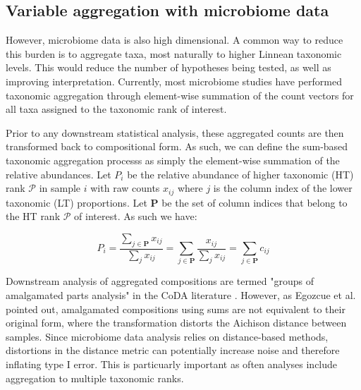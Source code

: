 \documentclass{article}
\begin{document}
\subsection*{Variable aggregation with microbiome data} 
However, microbiome data is also high dimensional. A common way to reduce this burden is to aggregate taxa, most naturally to higher Linnean taxonomic levels. This would reduce the number of hypotheses being tested, as well as improving interpretation. Currently, most microbiome studies have performed taxonomic aggregation through element-wise summation of the count vectors for all taxa assigned to the taxonomic rank of interest. 

Prior to any downstream statistical analysis, these aggregated counts are then transformed back to compositional form. As such, we can define the sum-based taxonomic aggregation processs as simply the element-wise summation of the relative abundances. Let $P_{i}$ be the relative abundance of higher taxonomic (HT) rank $\mathcal{P}$ in sample $i$ with raw counts $x_{ij}$ where $j$ is the column index of the lower taxonomic (LT) proportions. Let $\bm{P}$ be the set of column indices that belong to the HT rank $\mathcal{P}$ of interest. As such we have:    

\begin{equation}
P_{i} =\frac{\sum_{j \in \bm{P}} x_{ij}}{\sum_j x_{ij}} = \sum_{j \in \bm{P}} \frac{x_{ij}}{\sum_j x_{ij}} = \sum_{j \in \bm{P}} c_{ij}
\end{equation}

\noindent Downstream analysis of aggregated compositions are termed "groups of amalgamated parts analysis" in the CoDA literature \cite{egozcue2005}. However, as Egozcue et al. \cite{egozcue2005} pointed out, amalgamated compositions using sums are not equivalent to their original form, where the transformation distorts the Aichison distance between samples. Since microbiome data analysis relies on distance-based methods, distortions in the distance metric can potentially increase noise and therefore inflating type I error. This is particuarly important as often analyses include aggregation to multiple taxonomic ranks. \\
\end{document}

